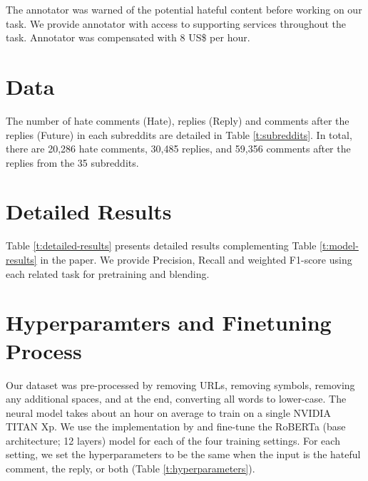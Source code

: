 \documentclass[11pt]{article}
\begin{document}
	The annotator was warned of the potential hateful content before working on our task. 
	We provide annotator with access to supporting services throughout the task.
	Annotator was compensated with 8 US\$ per hour.
	
	
	\section{Data}
	\label{sec:appendix_data}
	The number of hate comments (Hate), replies (Reply) and comments after the replies (Future) in each subreddits are detailed in Table \ref{t:subreddits}. 
	In total, there are 20,286 hate comments, 30,485 replies, and 59,356 comments after the replies from the 35 subreddits.
	
	
	
	\section{Detailed Results}
	\label{sec:appendix_results}
	Table \ref{t:detailed-results} presents detailed results complementing Table \ref{t:model-results} in the paper. 
	We provide Precision, Recall and weighted F1-score using each related task for pretraining and blending.
	
	
	\section{Hyperparamters and Finetuning Process}
	\label{sec:appendix_hyper}
	
	Our dataset was pre-processed by removing URLs, removing symbols, removing any additional spaces, and at the end, converting all words to lower-case. 
	The neural model takes about an hour on average to train on a single NVIDIA TITAN Xp. 
	We use the implementation by \citet{phang2020jiant} and fine-tune the RoBERTa (base architecture; 12 layers) \cite{DBLP:journals/corr/abs-1907-11692} model for each of the four training settings. 
	For each setting, we set the hyperparameters to be the same when the input is the hateful comment, the reply, or both (Table \ref{t:hyperparameters}).
	
\end{document}
